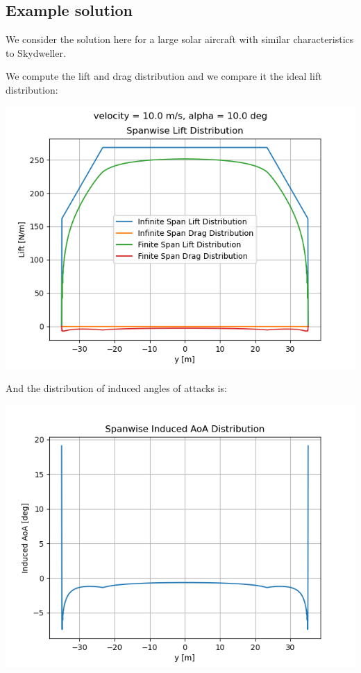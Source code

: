 \subsection{Example solution}
We consider the solution here for a large solar aircraft with similar characteristics to Skydweller.

We compute the lift and drag distribution and we compare it the ideal lift distribution:

\includegraphics[width=\textwidth]{input/ex_lift_drag_distribution.png}

And the distribution of induced angles of attacks is:

\includegraphics[width=\textwidth]{input/ex_induced_alpha.png}

